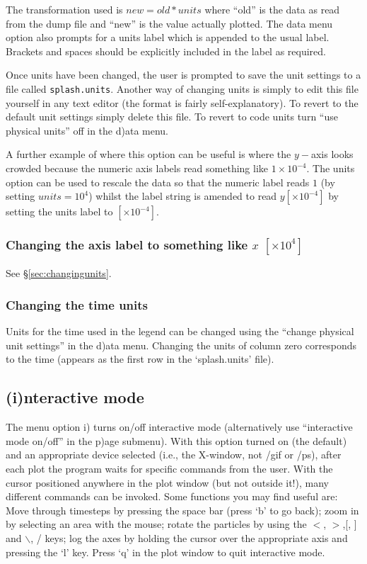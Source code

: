 \documentclass[a4paper,10pt]{article}
\begin{document}
 The transformation used is $new= old*units$ where ``old'' is the data as read from the dump file and ``new'' is the value actually plotted. The data menu option also prompts for a units label which is appended to the usual label. Brackets and spaces should be explicitly included in the label as required.
 
  Once units have been changed, the user is prompted to save the unit settings to a file called \verb+splash.units+. Another way of changing units is simply to edit this file yourself in any text editor (the format is fairly self-explanatory). To revert to the default unit settings simply delete this file. To revert to code units turn ``use physical units'' off in the d)ata menu.
 
 A further example of where this option can be useful is where the $y-$axis looks crowded because the numeric axis labels read something
like $1\times 10^{-4}$. The units option can be used to rescale the data so
that the numeric label reads $1$ (by setting $units=10^{4}$) whilst the label string is amended to read $y
[\times 10^{-4}]$ by setting the units label to $ [ \times 10^{-4}]$.

\subsubsection{ Changing the axis label to something like $x$ $[ \times 10^{4} ]$}
See \S\ref{sec:changingunits}.

\subsubsection{ Changing the time units}
\label{sec:timeunits}
Units for the time used in the legend can be changed using the ``change physical unit settings'' in the d)ata menu. Changing the units of column zero corresponds to the time (appears as the first row in the `splash.units' file). 

\subsection{(i)nteractive mode}%
\label{sec:interactive}
 The menu option i) turns on/off interactive mode (alternatively use ``interactive mode on/off'' in the p)age submenu). With this option turned on (the default) and
an appropriate device selected (i.e., the X-window, not /gif or /ps), after
each plot the program waits for specific commands from the user. With the cursor
positioned anywhere in the plot window (but not outside it!), many different
commands can be invoked. Some functions you may find useful are: Move through timesteps by pressing the space bar (press
 `b' to go back); zoom in by selecting an area with the mouse; rotate the
particles by using the $<$, $>$,[, ] and $\backslash$, / keys; log the axes by holding the cursor
over the appropriate axis and pressing the `l' key. Press `q' in the plot window
to quit interactive mode.
\end{document}
